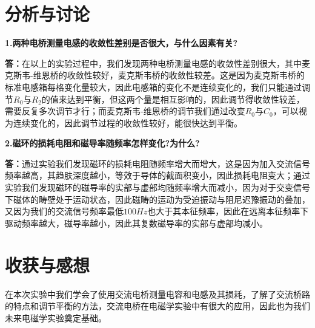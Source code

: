 \documentclass[UTF8]{ctexart}
\begin{document}
	\section{分析与讨论}
	\textbf{1.两种电桥测量电感的收敛性差别是否很大，与什么因素有关?}
	\par \textbf{答：}在以上的实验过程中，我们发现两种电桥测量电感的收敛性差别很大，其中麦克斯韦-维恩桥的收敛性较好，麦克斯韦桥的收敛性较差。这是因为麦克斯韦桥的标准电感箱每格变化量较大，因此电感箱的变化不是连续变化的，我们只能通过调节$R_{0}$与$R_{2}$的值来达到平衡，但这两个量是相互影响的，因此调节得收敛性较差，需要反复多次调节才行；而麦克斯韦-维恩桥的调节我们通过改变$R_{0}$与$C_{0}$，可以视为连续变化的，因此调节过程的收敛性较好，能很快达到平衡。
	\par \textbf{2.磁环的损耗电阻和磁导率随频率怎样变化?为什么?}
	\par \textbf{答：}通过实验我们发现磁环的损耗电阻随频率增大而增大，这是因为加入交流信号频率越高，其趋肤深度越小，等效于导体的截面积变小，因此损耗电阻变大；通过实验我们发现磁环的磁导率的实部与虚部均随频率增大而减小，因为对于交变信号下磁体的畴壁处于运动状态，因此磁畴的运动为受迫振动与阻尼迟豫振动的叠加，又因为我们的交流信号频率最低$100Hz$也大于其本征频率，因此在远离本征频率下驱动频率越大，磁导率越小，因此其复数磁导率的实部与虚部均减小。
	\section{收获与感想}
	在本次实验中我们学会了使用交流电桥测量电容和电感及其损耗，了解了交流桥路的特点和调节平衡的方法，交流电桥在电磁学实验中有很大的应用，因此也为我们未来电磁学实验奠定基础。
\end{document}
